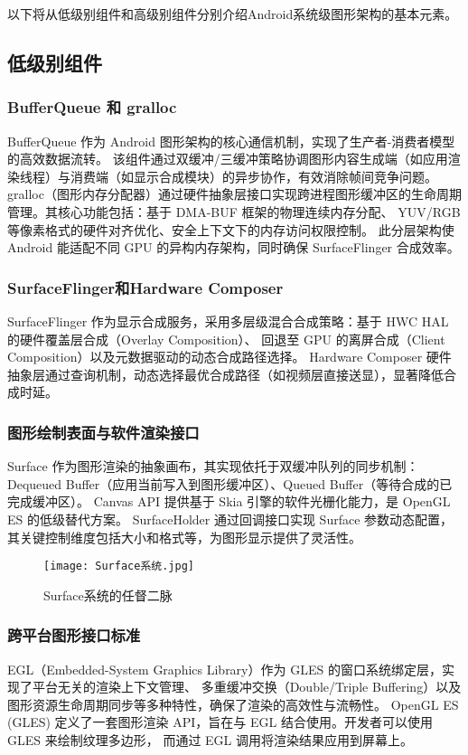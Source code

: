 以下将从低级别组件和高级别组件分别介绍Android系统级图形架构的基本元素。

\subsection{低级别组件}

\subsubsection{BufferQueue 和 gralloc}
BufferQueue 作为 Android 图形架构的核心通信机制，实现了生产者-消费者模型的高效数据流转。
该组件通过双缓冲/三缓冲策略协调图形内容生成端（如应用渲染线程）与消费端（如显示合成模块）的异步协作，有效消除帧间竞争问题。
gralloc（图形内存分配器）通过硬件抽象层接口实现跨进程图形缓冲区的生命周期管理。其核心功能包括：基于 DMA-BUF 框架的物理连续内存分配、
YUV/RGB 等像素格式的硬件对齐优化、安全上下文下的内存访问权限控制。
此分层架构使 Android 能适配不同 GPU 的异构内存架构，同时确保 SurfaceFlinger 合成效率。

\subsubsection{SurfaceFlinger和Hardware Composer}
SurfaceFlinger 作为显示合成服务，采用多层级混合合成策略：基于 HWC HAL 的硬件覆盖层合成（Overlay Composition）、
回退至 GPU 的离屏合成（Client Composition）以及元数据驱动的动态合成路径选择。
Hardware Composer 硬件抽象层通过查询机制，动态选择最优合成路径（如视频层直接送显），显著降低合成时延。

\subsubsection{图形绘制表面与软件渲染接口}
Surface 作为图形渲染的抽象画布，其实现依托于双缓冲队列的同步机制：Dequeued Buffer（应用当前写入到图形缓冲区）、Queued Buffer（等待合成的已完成缓冲区）。
Canvas API 提供基于 Skia 引擎的软件光栅化能力，是 OpenGL ES 的低级替代方案。
SurfaceHolder 通过回调接口实现 Surface 参数动态配置，其关键控制维度包括大小和格式等，为图形显示提供了灵活性。

\begin{figure}[h]
  \centering
  \texttt{[image: Surface系统.jpg]}
  \caption{Surface系统的任督二脉}    
  \label{fig:Surface系统的任督二脉}
  \cite{邓凡平2011深入理解}
\end{figure}


\subsubsection{跨平台图形接口标准}
EGL（Embedded-System Graphics Library）作为 GLES 的窗口系统绑定层，实现了平台无关的渲染上下文管理、
多重缓冲交换（Double/Triple Buffering）以及图形资源生命周期同步等多种特性，确保了渲染的高效性与流畅性。
OpenGL ES (GLES) 定义了一套图形渲染 API，旨在与 EGL 结合使用。开发者可以使用 GLES 来绘制纹理多边形，
而通过 EGL 调用将渲染结果应用到屏幕上。

